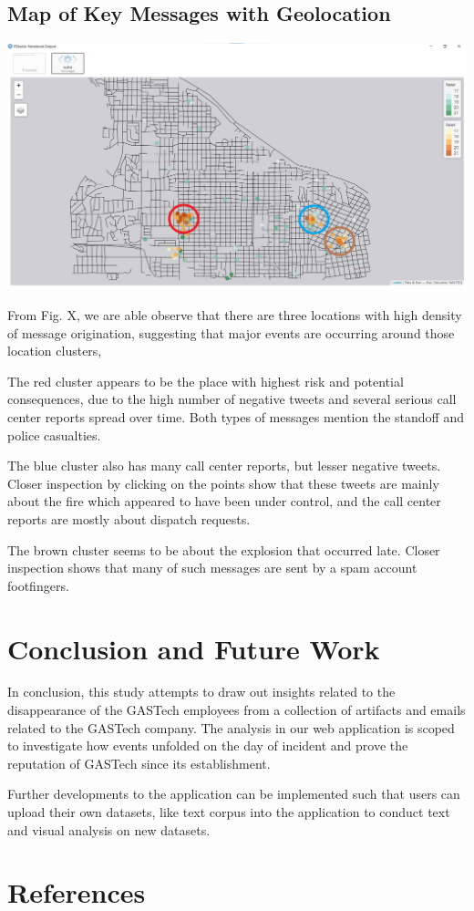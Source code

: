 \documentclass{acm_proc_article-sp}
\begin{document}
\hypertarget{map-of-key-messages-with-geolocation}{%
\subsection{Map of Key Messages with
Geolocation}\label{map-of-key-messages-with-geolocation}}

\includegraphics{img/image11.png}

From Fig. X, we are able observe that there are three locations with
high density of message origination, suggesting that major events are
occurring around those location clusters,

The red cluster appears to be the place with highest risk and potential
consequences, due to the high number of negative tweets and several
serious call center reports spread over time. Both types of messages
mention the standoff and police casualties.

The blue cluster also has many call center reports, but lesser negative
tweets. Closer inspection by clicking on the points show that these
tweets are mainly about the fire which appeared to have been under
control, and the call center reports are mostly about dispatch requests.

The brown cluster seems to be about the explosion that occurred late.
Closer inspection shows that many of such messages are sent by a spam
account footfingers.

\hypertarget{conclusion-and-future-work}{%
\section{Conclusion and Future Work}\label{conclusion-and-future-work}}

In conclusion, this study attempts to draw out insights related to the
disappearance of the GASTech employees from a collection of artifacts
and emails related to the GASTech company. The analysis in our web
application is scoped to investigate how events unfolded on the day of
incident and prove the reputation of GASTech since its establishment.

Further developments to the application can be implemented such that
users can upload their own datasets, like text corpus into the
application to conduct text and visual analysis on new datasets.

\hypertarget{references}{%
\section{References}\label{references}}
\setlength{\parindent}{0in}
\end{document}
